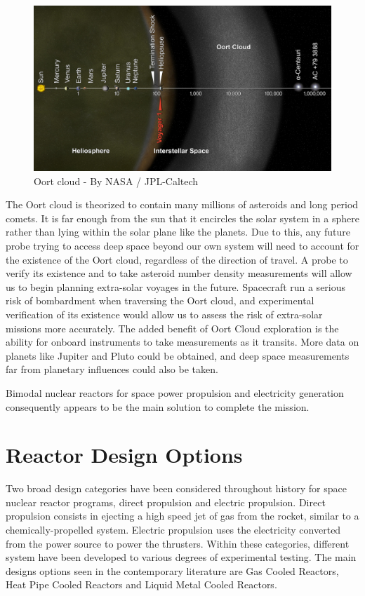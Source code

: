 \documentclass{article}
\begin{document}
\begin{figure}[]
	\centering
	\includegraphics[height=0.35\textheight]{fig/oortcloud}
	\caption[Oort cloud]{Oort cloud - By NASA / JPL-Caltech}
	\label{oort}
\end{figure}

The Oort cloud is theorized to contain many millions of asteroids and long period comets. It is
far enough from the sun that it encircles the solar system in a sphere rather than lying within
the solar plane like the planets. Due to this, any future probe trying to access deep space
beyond our own system will need to account for the existence of the Oort cloud, regardless of
the direction of travel. A probe to verify its existence and to take asteroid number density
measurements will allow us to begin planning extra-solar voyages in the future. Spacecraft run
a serious risk of bombardment when traversing the Oort cloud, and experimental verification of
its existence would allow us to assess the risk of extra-solar missions more accurately. The
added benefit of Oort Cloud exploration is the ability for onboard instruments to take
measurements as it transits. More data on planets like Jupiter and Pluto could be obtained, and
deep space measurements far from planetary influences could also be taken.

Bimodal nuclear reactors for space power propulsion and electricity generation consequently appears to be the main solution to complete the mission.


\section{Reactor Design Options}

Two broad design categories have been considered throughout history for space nuclear reactor programs, direct propulsion and electric propulsion. Direct propulsion consists in ejecting a high speed jet of gas from the rocket, similar to a chemically-propelled system. Electric propulsion uses the electricity converted from the power source to power the thrusters. Within these categories, different system have been developed to various degrees of experimental testing. The main designs options seen in the contemporary literature are Gas Cooled Reactors, Heat Pipe Cooled Reactors and Liquid Metal Cooled Reactors.
\end{document}
